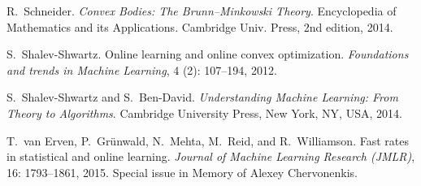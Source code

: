 \documentclass[english]{article}
\begin{document}
\begin{thebibliography}{30}
R.~Schneider.
\newblock \emph{Convex Bodies: The {B}runn--{M}inkowski Theory}.
\newblock Encyclopedia of Mathematics and its Applications. Cambridge Univ.
  Press, 2nd edition, 2014.

S.~Shalev-Shwartz.
\newblock Online learning and online convex optimization.
\newblock \emph{Foundations and trends in Machine Learning}, 4
  (2): 107--194, 2012.

S.~Shalev-Shwartz and S.~Ben-David.
\newblock \emph{Understanding Machine Learning: From Theory to Algorithms}.
\newblock Cambridge University Press, New York, NY, USA, 2014.

T.~van Erven, P.~Gr\"unwald, N.~Mehta, M.~Reid, and R.~Williamson.
\newblock Fast rates in statistical and online learning.
\newblock \emph{Journal of Machine Learning Research (JMLR)}, 16:
  1793--1861, 2015.
\newblock Special issue in Memory of Alexey Chervonenkis.

\end{thebibliography}
\end{document}
